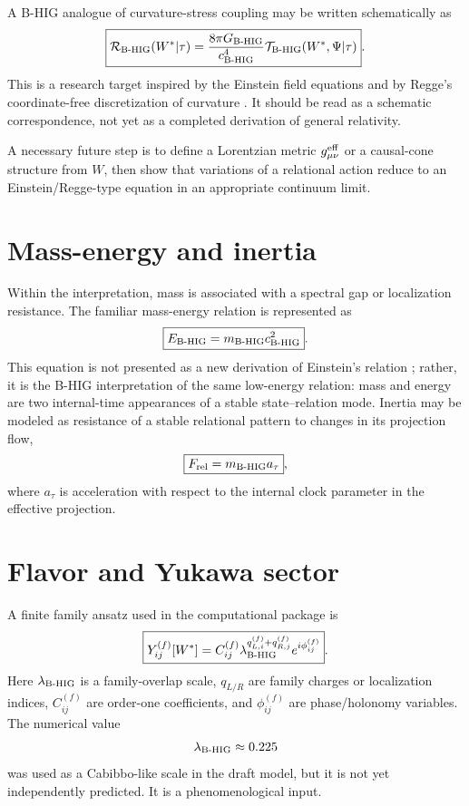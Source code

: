 \documentclass[11pt,a4paper]{article}
\newcommand{\Wstar}{W^{\ast}}
\begin{document}
A B-HIG analogue of curvature-stress coupling may be written schematically as
\begin{equation}
\boxed{
\mathcal{R}_{\rm B\text{-}HIG}(\Wstar|\tau)=
\frac{8\pi G_{\rm B\text{-}HIG}}{c_{\rm B\text{-}HIG}^{4}}
\mathcal{T}_{\rm B\text{-}HIG}(\Wstar,\Psi|\tau)
} .
\label{eq:relational_einstein}
\end{equation}
This is a research target inspired by the Einstein field equations \cite{Einstein1915} and by Regge's coordinate-free discretization of curvature \cite{Regge1961}. It should be read as a schematic correspondence, not yet as a completed derivation of general relativity.

A necessary future step is to define a Lorentzian metric $g_{\mu\nu}^{\rm eff}$ or a causal-cone structure from $W$, then show that variations of a relational action reduce to an Einstein/Regge-type equation in an appropriate continuum limit.

\section{Mass-energy and inertia}
Within the interpretation, mass is associated with a spectral gap or localization resistance. The familiar mass-energy relation is represented as
\begin{equation}
\boxed{E_{\rm B\text{-}HIG}=m_{\rm B\text{-}HIG}c_{\rm B\text{-}HIG}^2} .
\label{eq:mass_energy}
\end{equation}
This equation is not presented as a new derivation of Einstein's relation \cite{Einstein1905}; rather, it is the B-HIG interpretation of the same low-energy relation: mass and energy are two internal-time appearances of a stable state--relation mode. Inertia may be modeled as resistance of a stable relational pattern to changes in its projection flow,
\begin{equation}
\boxed{F_{\rm rel}=m_{\rm B\text{-}HIG}a_{\tau}} ,
\end{equation}
where $a_\tau$ is acceleration with respect to the internal clock parameter in the effective projection.

\section{Flavor and Yukawa sector}
A finite family ansatz used in the computational package is
\begin{equation}
\boxed{
Y_{ij}^{(f)}[\Wstar]=C_{ij}^{(f)}\lambda_{\rm B\text{-}HIG}^{q_{L,i}^{(f)}+q_{R,j}^{(f)}}e^{i\phi_{ij}^{(f)}}
} .
\label{eq:yukawa}
\end{equation}
Here $\lambda_{\rm B\text{-}HIG}$ is a family-overlap scale, $q_{L/R}$ are family charges or localization indices, $C_{ij}^{(f)}$ are order-one coefficients, and $\phi_{ij}^{(f)}$ are phase/holonomy variables. The numerical value
\begin{equation}
\lambda_{\rm B\text{-}HIG}\approx 0.225
\end{equation}
was used as a Cabibbo-like scale in the draft model, but it is not yet independently predicted. It is a phenomenological input.
\end{document}
